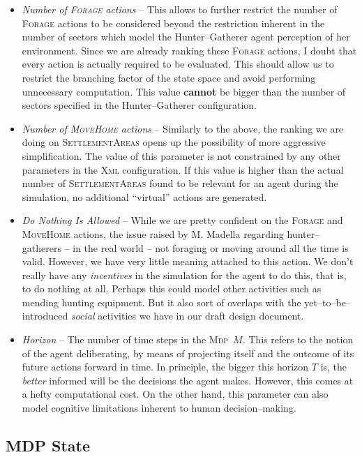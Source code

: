 \documentclass[a4paper,10pt]{article}
\newcommand{\mdp}{\textsc{Mdp}}
\begin{document}
\begin{itemize}
 \item \emph{Number of \textsc{Forage} actions} -- This allows to further restrict the number of \textsc{Forage} actions
to be considered beyond the restriction inherent in the number of sectors which model the Hunter--Gatherer agent perception
of her environment. Since we are already ranking these \textsc{Forage} actions, I doubt that every action is actually required
to be evaluated. This should allow us to restrict the branching factor of the state space and avoid performing unnecessary
computation. This value \textbf{cannot} be bigger than the number of sectors specified in the Hunter--Gatherer configuration.
\item \emph{Number of \textsc{MoveHome} actions} -- Similarly to the above, the ranking we are doing on 
\textsc{SettlementAreas} opens up the possibility of more aggressive simplification. The value of this parameter is not
constrained by any other parameters in the \textsc{Xml} configuration. If this value is higher than the actual number of
\textsc{SettlementAreas} found to be relevant for an agent during the simulation, no additional ``virtual'' actions are
generated.
\item \emph{Do Nothing Is Allowed} -- While we are pretty confident on the \textsc{Forage} and \textsc{MoveHome} actions,
the issue raised by M. Madella regarding hunter--gatherers -- in the real world -- not foraging or moving around all the
time is valid. However, we have very little meaning attached to this action. We don't really have any \emph{incentives}
in the simulation for the agent to do this, that is, to do nothing at all. Perhaps this could model other activities
such as mending hunting equipment. But it also sort of overlaps with the yet--to--be--introduced \emph{social} activities
we have in our draft design document.
\item \emph{Horizon} -- The number of time steps in the \mdp~$M$. This refers to the notion of the agent deliberating,
by means of projecting itself and the outcome of its future actions forward in time. In principle, the bigger this
horizon $T$ is, the \emph{better} informed will be the decisions the agent makes. However, this comes at a hefty
computational cost. On the other hand, this parameter can also model cognitive limitations inherent to human decision--making.
\end{itemize}


\subsection{MDP State}
\end{document}
